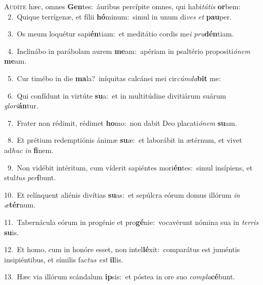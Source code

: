 \lettrine{\initial\textcolor{\initialcolor}{A}}{udíte} hæc, omnes \textbf{Gen}\-tes:~\star áuribus percípite omnes, qui habi\-\textit{tá}\-\textit{tis} \textbf{or}\-bem:\\
{\numbfont\textcolor{\numbcolor}{~2.}}~Quique terrígenæ, et fílii \textbf{hó}\-minum:~\star simul in unum di\textit{ves} \textit{et} \textbf{pau}\-per.\par
{\numbfont\textcolor{\numbcolor}{~3.}}~Os meum loquétur sapi\-\textbf{én}\-tiam:~\star et meditátio cordis me\textit{i} \textit{pru}\-\textbf{dén}tiam.\par
{\numbfont\textcolor{\numbcolor}{~4.}}~Inclinábo in parábolam aurem \textbf{me}\-am:~\star apériam in psaltério propositi\-\textit{ó}\-\textit{nem} \textbf{me}\-am.\par
{\numbfont\textcolor{\numbcolor}{~5.}}~Cur timébo in die \textbf{ma}\-la?~\star iníquitas calcánei mei cir\-\textit{cúm}\-\textit{da}\textbf{bit} me:\par
{\numbfont\textcolor{\numbcolor}{~6.}}~Qui confídunt in virtúte \textbf{su}\-a:~\star et in multitúdine divitiárum suárum \textit{glo}\-\textit{ri}\textbf{án}tur.\par
{\numbfont\textcolor{\numbcolor}{~7.}}~Frater non rédimit, rédimet \textbf{ho}\-mo:~\star non dabit Deo placati\-\textit{ó}\-\textit{nem} \textbf{su}\-am.\par
{\numbfont\textcolor{\numbcolor}{~8.}}~Et prétium redemptiónis ánimæ \textbf{su}\-æ:~\star et laborábit in ætérnum, et vivet ad\textit{huc} \textit{in} \textbf{fi}\-nem.\par
{\numbfont\textcolor{\numbcolor}{~9.}}~Non vidébit intéritum, cum víderit sapiéntes mori\-\textbf{én}\-tes:~\star simul insípiens, et stul\textit{tus} \textit{per}\-\textbf{í}bunt.\par
{\numbfont\textcolor{\numbcolor}{10.}}~Et relínquent aliénis divítias \textbf{su}\-as:~\star et sepúlcra eórum domus illórum \textit{in} \textit{æ}\-\textbf{tér}num.\par
{\numbfont\textcolor{\numbcolor}{11.}}~Tabernácula eórum in progénie et pro\-\textbf{gé}\-nie:~\star vocavérunt nómina sua in \textit{ter}\-\textit{ris} \textbf{su}\-is.\par
{\numbfont\textcolor{\numbcolor}{12.}}~Et homo, cum in honóre esset, non intel\-\textbf{lé}\-xit:~\star comparátus est juméntis insipiéntibus, et símilis fac\textit{tus} \textit{est} \textbf{il}\-lis.\par
{\numbfont\textcolor{\numbcolor}{13.}}~Hæc via illórum scándalum \textbf{ip}\-sis:~\star et póstea in ore suo \textit{com}\-\textit{pla}\textbf{cé}bunt.\par
